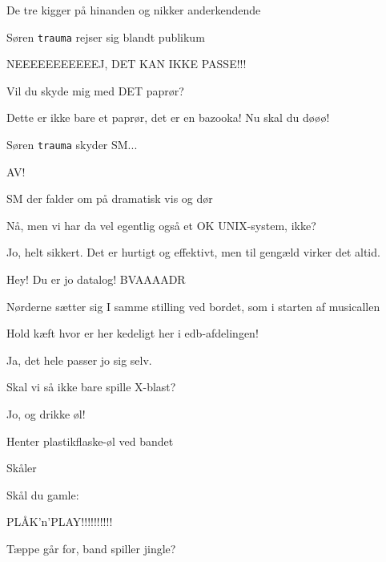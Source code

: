 \documentclass[danish]{article}
\begin{document}
\begin{sketch}
\scene De tre kigger på hinanden og nikker anderkendende

\scene Søren \texttt{trauma} rejser sig blandt publikum

 NEEEEEEEEEEEJ, DET KAN IKKE PASSE!!!

 Vil du skyde mig med DET paprør?

 Dette er ikke bare et paprør, det er en bazooka! Nu skal du døøø!

\scene Søren \texttt{trauma} skyder SM...

 AV!

\scene SM der falder om på dramatisk vis og dør

 Nå, men vi har da vel egentlig også et OK UNIX-system, ikke?

 Jo, helt sikkert. Det er hurtigt og effektivt, men til gengæld
virker det altid.

 Hey! Du er jo datalog! BVAAAADR 

\scene Nørderne sætter sig I samme stilling ved bordet, som i starten af
musicallen

 Hold kæft hvor er her kedeligt her i edb-afdelingen!

 Ja, det hele passer jo sig selv.

 Skal vi så ikke bare spille X-blast?

 Jo, og drikke øl!

\scene Henter plastikflaske-øl ved bandet

\scene Skåler

 Skål du gamle:

  PLÅK'n'PLAY!!!!!!!!!!

\scene Tæppe går for, band spiller jingle?

\end{sketch}
\end{document}
